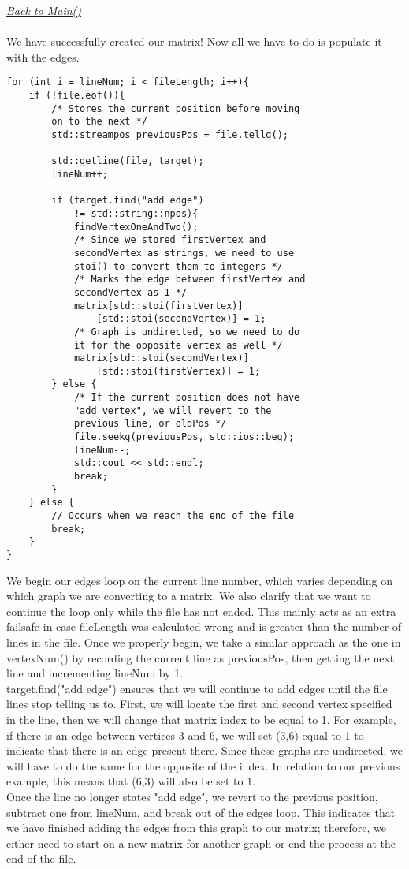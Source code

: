 \documentclass{article}
\begin{document}
\underline{\textit{Back to Main()}} \\ \\
We have successfully created our matrix! Now all we have to do is populate it with the edges. 
\begin{lstlisting}
for (int i = lineNum; i < fileLength; i++){
    if (!file.eof()){
        /* Stores the current position before moving 
        on to the next */
        std::streampos previousPos = file.tellg();

        std::getline(file, target);
        lineNum++;

        if (target.find("add edge") 
            != std::string::npos){
            findVertexOneAndTwo();
            /* Since we stored firstVertex and 
            secondVertex as strings, we need to use 
            stoi() to convert them to integers */
            /* Marks the edge between firstVertex and 
            secondVertex as 1 */
            matrix[std::stoi(firstVertex)]
                [std::stoi(secondVertex)] = 1;
            /* Graph is undirected, so we need to do 
            it for the opposite vertex as well */
            matrix[std::stoi(secondVertex)]
                [std::stoi(firstVertex)] = 1;
        } else {
            /* If the current position does not have 
            "add vertex", we will revert to the 
            previous line, or oldPos */
            file.seekg(previousPos, std::ios::beg);
            lineNum--;
            std::cout << std::endl;
            break;
        }
    } else {
        // Occurs when we reach the end of the file
        break;
    }
}
\end{lstlisting}
We begin our edges loop on the current line number, which varies depending on which graph we are converting to a matrix. We also clarify that we want to continue the loop only while the file has not ended. This mainly acts as an extra failsafe in case fileLength was calculated wrong and is greater than the number of lines in the file. Once we properly begin, we take a similar approach as the one in vertexNum() by recording the current line as previousPos, then getting the next line and incrementing lineNum by 1. \\
target.find("add edge") ensures that we will continue to add edges until the file lines stop telling us to. First, we will locate the first and second vertex specified in the line, then we will change that matrix index to be equal to 1. For example, if there is an edge between vertices 3 and 6, we will set (3,6) equal to 1 to indicate that there is an edge present there. Since these graphs are undirected, we will have to do the same for the opposite of the index. In relation to our previous example, this means that (6,3) will also be set to 1. \\
Once the line no longer states "add edge", we revert to the previous position, subtract one from lineNum, and break out of the edges loop. This indicates that we have finished adding the edges from this graph to our matrix; therefore, we either need to start on a new matrix for another graph or end the process at the end of the file. \\
\end{document}
